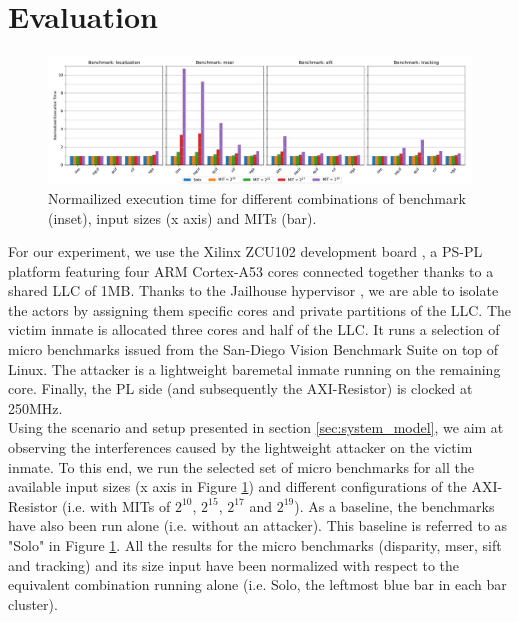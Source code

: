 \section{Evaluation}
    \label{sec:evaluation}
    \begin{figure}
        \centering
        \includegraphics[scale=0.425]{images/cpu-brainfreeze-interference.pdf}
        \caption{Normailized execution time for different combinations of benchmark (inset), input sizes (x axis) and MITs (bar).}
        \label{fig:cpu-brainfreeze-interference-results}
    \end{figure}

    For our experiment, we use the Xilinx ZCU102 development board \cite{Xilinx-ULTRASCALE-TRM}, a PS-PL platform featuring four ARM Cortex-A53 cores \cite{ARM-cortex-A53} connected together thanks to a shared LLC of 1MB.
    Thanks to the Jailhouse hypervisor \cite{jailhouse}, we are able to isolate the actors by assigning them specific cores and private partitions of the LLC.
    The victim inmate is allocated three cores and half of the LLC.
    It runs a selection of micro benchmarks issued from the San-Diego Vision Benchmark Suite \cite{SD-VBS} on top of Linux.
    The attacker is a lightweight baremetal inmate running on the remaining core.
    Finally, the PL side (and subsequently the AXI-Resistor) is clocked at 250MHz.\\

    Using the scenario and setup presented in section \ref{sec:system_model}, we aim at observing the interferences caused by the lightweight attacker on the victim inmate.
    To this end, we run the selected set of micro benchmarks for all the available input sizes (x axis in Figure \ref{fig:cpu-brainfreeze-interference-results}) and different configurations of the AXI-Resistor (i.e. with MITs of $2^{10}$, $2^{15}$, $2^{17}$ and $2^{19}$).
    As a baseline, the benchmarks have also been run alone (i.e. without an attacker).
    This baseline is referred to as "Solo" in Figure \ref{fig:cpu-brainfreeze-interference-results}.
    All the results for the micro benchmarks (disparity, mser, sift and tracking) and its size input have been normalized with respect to the equivalent combination running alone (i.e. Solo, the leftmost blue bar in each bar cluster).


